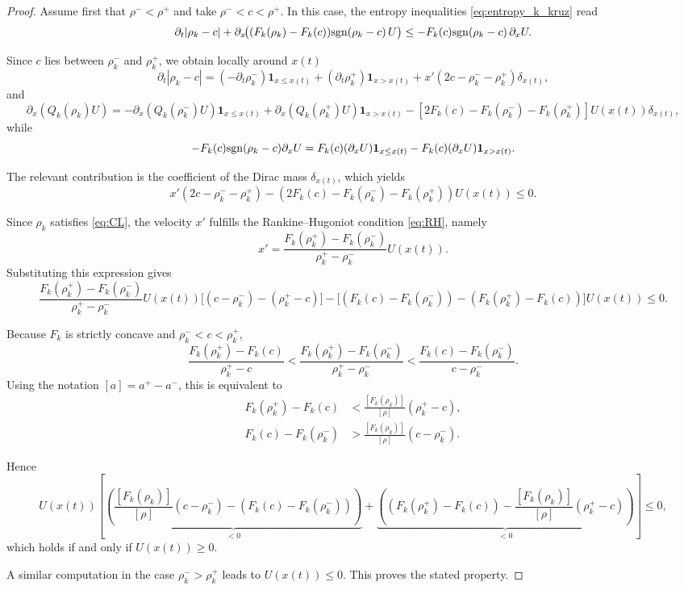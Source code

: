 \documentclass[11pt,twoside]{article}
\numberwithin{equation}{section}
\newcommand {\sgn} { {\rm sgn} }
\begin{document}
\begin{proof}
Assume first that $\rho^- < \rho^+$ and take $\rho^- < c < \rho^+$.  
In this case, the entropy inequalities \eqref{eq:entropy_k_kruz} read
\[
\partial_t|\rho_k-c| 
+ \partial_x\!\big((F_k(\rho_k)-F_k(c))\sgn(\rho_k-c)\,U\big)
\le - F_k(c)\sgn(\rho_k-c)\,\partial_x U.
\]

Since $c$ lies between $\rho_k^-$ and $\rho_k^+$, we obtain locally around $x(t)$
\[
\partial_t|\rho_k-c|
= (-\partial_t\rho_k^-)\mathbf{1}_{x\le x(t)}
+ (\partial_t\rho_k^+)\mathbf{1}_{x>x(t)}
+ x'(2c-\rho_k^- -\rho_k^+)\delta_{x(t)},
\]
and
\[
\partial_x(Q_k(\rho_k)U)
= -\partial_x(Q_k(\rho_k^-)U)\mathbf{1}_{x\le x(t)}
+ \partial_x(Q_k(\rho_k^+)U)\mathbf{1}_{x>x(t)}
- [2F_k(c)-F_k(\rho_k^-)-F_k(\rho_k^+)]U(x(t))\delta_{x(t)},
\]
while
\[
- F_k(c)\sgn(\rho_k-c)\partial_x U
= F_k(c)(\partial_x U)\mathbf{1}_{x\le x(t)}
- F_k(c)(\partial_x U)\mathbf{1}_{x>x(t)}.
\]

The relevant contribution is the coefficient of the Dirac mass $\delta_{x(t)}$, which yields
\[
x'(2c-\rho_k^- -\rho_k^+)
- (2F_k(c)-F_k(\rho_k^-)-F_k(\rho_k^+))U(x(t))
\le 0.
\]

Since $\rho_k$ satisfies \eqref{eq:CL}, the velocity $x'$ fulfills the Rankine–Hugoniot condition \eqref{eq:RH}, namely
\[
x' = \frac{F_k(\rho_k^+)-F_k(\rho_k^-)}{\rho_k^+ - \rho_k^-}U(x(t)).
\]
Substituting this expression gives
\[
\frac{F_k(\rho_k^+)-F_k(\rho_k^-)}{\rho_k^+ - \rho_k^-}U(x(t))
\big[(c-\rho_k^-)-(\rho_k^+-c)\big]
- \big[(F_k(c)-F_k(\rho_k^-))-(F_k(\rho_k^+)-F_k(c))\big]U(x(t))
\le 0.
\]

Because $F_k$ is strictly concave and $\rho_k^- < c < \rho_k^+$,
\[
\frac{F_k(\rho_k^+)-F_k(c)}{\rho_k^+-c}
<
\frac{F_k(\rho_k^+)-F_k(\rho_k^-)}{\rho_k^+-\rho_k^-}
<
\frac{F_k(c)-F_k(\rho_k^-)}{c-\rho_k^-}.
\]
Using the notation $[a]=a^+-a^-$, this is equivalent to
\[
\begin{aligned}
F_k(\rho_k^+)-F_k(c)
&< \frac{[F_k(\rho_k)]}{[\rho]}(\rho_k^+-c),\\
F_k(c)-F_k(\rho_k^-)
&> \frac{[F_k(\rho_k)]}{[\rho]}(c-\rho_k^-).
\end{aligned}
\]

Hence
\[
U(x(t))\!\left[
\underbrace{\left(\frac{[F_k(\rho_k)]}{[\rho]}(c-\rho_k^-)
- (F_k(c)-F_k(\rho_k^-))\right)}_{<0}
+
\underbrace{\left((F_k(\rho_k^+)-F_k(c))
- \frac{[F_k(\rho_k)]}{[\rho]}(\rho_k^+-c)\right)}_{<0}
\right]
\le 0,
\]
which holds if and only if $U(x(t)) \ge 0$.

A similar computation in the case $\rho_k^- > \rho_k^+$ leads to $U(x(t)) \le 0$. This proves the stated property.
\end{proof}
\end{document}
